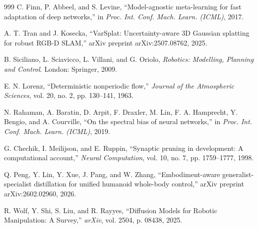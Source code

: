 \documentclass[12pt,a4paper,oneside]{report}
\begin{document}
\begin{thebibliography}{999}
C. Finn, P. Abbeel, and S. Levine, ``Model-agnostic meta-learning for fast adaptation of deep networks,'' in \textit{Proc. Int. Conf. Mach. Learn. (ICML)}, 2017.

A. T. Tran and J. Kosecka, ``{VarSplat}: Uncertainty-aware {3D} Gaussian splatting for robust {RGB-D} {SLAM},'' arXiv preprint arXiv:2507.08762, 2025.

B. Siciliano, L. Sciavicco, L. Villani, and G. Oriolo, \textit{Robotics: Modelling, Planning and Control}. London: Springer, 2009.

E. N. Lorenz, ``Deterministic nonperiodic flow,'' \textit{Journal of the Atmospheric Sciences}, vol. 20, no. 2, pp. 130--141, 1963.

N. Rahaman, A. Baratin, D. Arpit, F. Draxler, M. Lin, F. A. Hamprecht, Y. Bengio, and A. Courville, ``On the spectral bias of neural networks,'' in \textit{Proc. Int. Conf. Mach. Learn. (ICML)}, 2019.

G. Chechik, I. Meilijson, and E. Ruppin, ``Synaptic pruning in development: A computational account,'' \textit{Neural Computation}, vol. 10, no. 7, pp. 1759--1777, 1998.

Q. Peng, Y. Lin, Y. Xue, J. Pang, and W. Zhang, ``Embodiment-aware generalist-specialist distillation for unified humanoid whole-body control,'' arXiv preprint arXiv:2602.02960, 2026.

R. Wolf, Y. Shi, S. Liu, and R. Rayyes, ``Diffusion Models for Robotic Manipulation: A Survey,'' \textit{arXiv}, vol. 2504, p. 08438, 2025.

\end{thebibliography}
\end{document}
